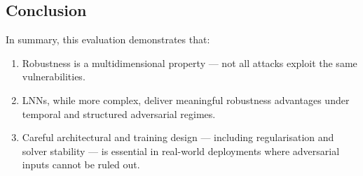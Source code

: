 \subsection{Conclusion}

In summary, this evaluation demonstrates that:
\begin{enumerate}
    \item Robustness is a multidimensional property — not all attacks exploit the same vulnerabilities.
    \item LNNs, while more complex, deliver meaningful robustness advantages under temporal and structured adversarial regimes.
    \item Careful architectural and training design — including regularisation and solver stability — is essential in real-world deployments where adversarial inputs cannot be ruled out.
\end{enumerate}
